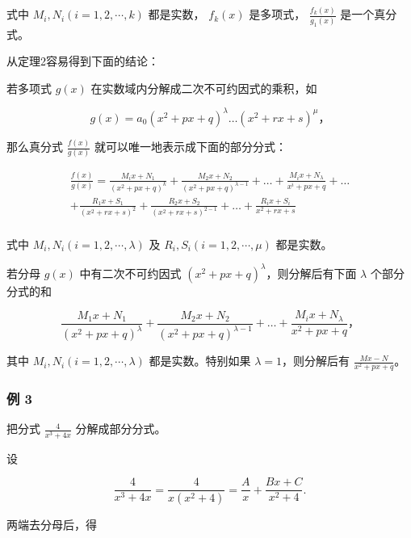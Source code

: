 式中 \(M_{i}, N_{i}(i=1,2,\cdots,k)\) 都是实数， \(f_{k}(x)\) 是多项式，
\(\frac{f_{k}(x)}{g_{1}(x)}\) 是一个真分式。

从定理2容易得到下面的结论：

若多项式 \(g(x)\) 在实数域内分解成二次不可约因式的乘积，如

\[
g (x) = a _ {0} \left(x ^ {2} + p x + q\right) ^ {\lambda} \dots \left(x ^ {2} + r x + s\right) ^ {\mu}\text{，}
\]

那么真分式 \(\frac{f(x)}{g(x)}\) 就可以唯一地表示成下面的部分分式：

\[
\begin{array}{l} \frac {f (x)}{g (x)} = \frac {M _ {i} x + N _ {1}}{\left(x ^ {2} + p x + q\right) ^ {k}} + \frac {M _ {2} x + N _ {2}}{\left(x ^ {2} + p x + q\right) ^ {\lambda - 1}} + \dots + \frac {M _ {i} x + N _ {\lambda}}{x ^ {i} + p x + q} + \dots \\ + \frac {R _ {1} x + S _ {1}}{\left(x ^ {2} + r x + s\right) ^ {2}} + \frac {R _ {2} x + S _ {2}}{\left(x ^ {2} + r x + s\right) ^ {2 - 1}} + \dots + \frac {R _ {i} x + S _ {i}}{x ^ {2} + r x + s} \tag {10} \\ \end{array}
\]

式中 \(M_{i}, N_{i} (i=1,2,\cdots,\lambda)\) 及
\(R_{i}, S_{i} (i=1,2,\cdots,\mu)\) 都是实数。

 若分母 \(g(x)\) 中有二次不可约因式
\((x^{2}+px+q)^{\lambda}\)，则分解后有下面 \(\lambda\) 个部分分式的和

\[
\frac {M _ {1} x + N _ {1}}{(x ^ {2} + p x + q) ^ {\lambda}} + \frac {M _ {2} x + N _ {2}}{(x ^ {2} + p x + q) ^ {\lambda - 1}} + \dots + \frac {M _ {i} x + N _ {\lambda}}{x ^ {2} + p x + q}\text{，}
\]

其中 \(M_{i}, N_{i} (i = 1, 2, \cdots, \lambda)\) 都是实数。特别如果
\(\lambda = 1\)，则分解后有 \(\frac{Mx - N}{x^2 + px + q}\)。

\subsubsection{例 3}

把分式 \(\frac{4}{x^3 + 4x}\) 分解成部分分式。

 设

\[
\frac {4}{x ^ {3} + 4 x} = \frac {4}{x (x ^ {2} + 4)} = \frac {A}{x} + \frac {B x + C}{x ^ {2} + 4}. \tag {11}
\]

两端去分母后，得

